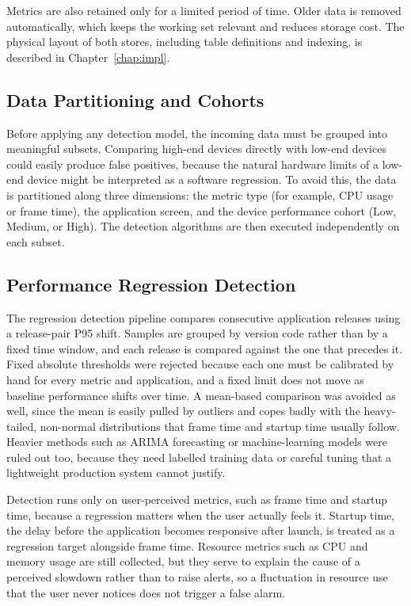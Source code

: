 Metrics are also retained only for a limited period of time. Older data is removed automatically, which keeps the working set relevant and reduces storage cost. The physical layout of both stores, including table definitions and indexing, is described in Chapter~\ref{chap:impl}.


\subsection{Data Partitioning and Cohorts}

Before applying any detection model, the incoming data must be grouped into meaningful subsets. Comparing high-end devices directly with low-end devices could easily produce false positives, because the natural hardware limits of a low-end device might be interpreted as a software regression. To avoid this, the data is partitioned along three dimensions: the metric type (for example, CPU usage or frame time), the application screen, and the device performance cohort (Low, Medium, or High). The detection algorithms are then executed independently on each subset.

\subsection{Performance Regression Detection}
\label{sec:detection}

The regression detection pipeline compares consecutive application releases using a release-pair P95 shift. Samples are grouped by version code rather than by a fixed time window, and each release is compared against the one that precedes it. Fixed absolute thresholds were rejected because each one must be calibrated by hand for every metric and application, and a fixed limit does not move as baseline performance shifts over time. A mean-based comparison was avoided as well, since the mean is easily pulled by outliers and copes badly with the heavy-tailed, non-normal distributions that frame time and startup time usually follow. Heavier methods such as ARIMA forecasting or machine-learning models were ruled out too, because they need labelled training data or careful tuning that a lightweight production system cannot justify.

Detection runs only on user-perceived metrics, such as frame time and startup time, because a regression matters when the user actually feels it. Startup time, the delay before the application becomes responsive after launch, is treated as a regression target alongside frame time. Resource metrics such as CPU and memory usage are still collected, but they serve to explain the cause of a perceived slowdown rather than to raise alerts, so a fluctuation in resource use that the user never notices does not trigger a false alarm.

